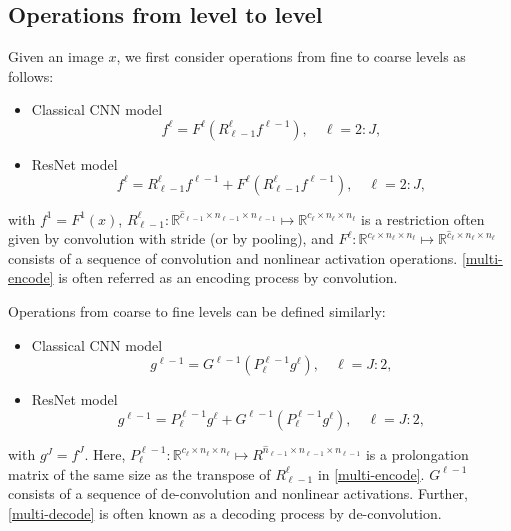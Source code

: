 \subsection{Operations from level to level}\label{ssc:level}
Given an image $x$, we first consider operations from fine to coarse
levels as follows:
\begin{itemize}
	\item Classical CNN model
\begin{equation}\label{multi-encode-classic}
f^{\ell} = F^{\ell}(R^{\ell}_{\ell -1} f^{\ell-1}), \quad \ell=2:J,
\end{equation}
	\item ResNet model
\begin{equation}\label{multi-encode}
f^{\ell} = R^{\ell}_{\ell -1} f^{\ell-1} + F^{\ell}(R^{\ell}_{\ell -1} f^{\ell-1}), \quad \ell=2:J,
\end{equation}
\end{itemize}
with $f^1 = F^1(x)$, $R^{\ell}_{\ell-1}: \mathbb R^{\hat
	c_{\ell-1}\times n_{\ell-1}\times n_{\ell-1}}\mapsto \mathbb
R^{c_\ell \times n_{\ell}\times n_{\ell}}$ is a restriction often
given by convolution with stride (or by pooling), and $F^\ell: \mathbb
R^{c_\ell \times n_{\ell}\times n_{\ell}}\mapsto \mathbb R^{\hat
	c_\ell \times n_{\ell}\times n_{\ell}}$ consists of a sequence of
convolution and nonlinear activation operations. \eqref{multi-encode}
is often referred as an encoding process by convolution.

Operations from coarse to fine levels can be defined similarly:
\begin{itemize}
	\item Classical CNN model
	\begin{equation}\label{multi-decode-classic}
	g^{\ell-1} = G^{\ell-1}(P^{\ell-1}_{\ell}g^{\ell}), \quad \ell=J:2,
	\end{equation}
	\item ResNet model
	\begin{equation}\label{multi-decode}
	g^{\ell-1} =P^{\ell-1}_{\ell}g^{\ell} + G^{\ell-1}(P^{\ell-1}_{\ell}g^{\ell}), \quad \ell=J:2,
	\end{equation}
\end{itemize}
with $g^{J} = f^J$.  Here, $P^{\ell-1}_{\ell}: \mathbb R^{c_{\ell}
	\times n_{\ell}\times n_{\ell}}\mapsto R^{\hat n_{\ell-1}\times
	n_{\ell-1}\times n_{\ell-1}}$ is a prolongation matrix of the same
size as the transpose of $R^{\ell}_{\ell-1}$ in \eqref{multi-encode}.
$G^{\ell-1}$ consists of a sequence of de-convolution and nonlinear
activations.  Further,  \eqref{multi-decode} is often known as a decoding
process by de-convolution.

